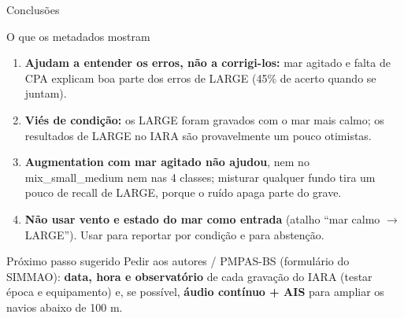 \documentclass[aspectratio=169]{beamer}
\begin{document}
\begin{frame}{Conclusões}
    \footnotesize
    \begin{block}{\small O que os metadados mostram}
        \scriptsize
        \begin{enumerate}
            \setlength{\itemsep}{2pt}
            \item \textbf{Ajudam a entender os erros, não a corrigi-los:} mar agitado e falta de CPA explicam boa parte dos erros de LARGE (45\% de acerto quando se juntam).
            \item \textbf{Viés de condição:} os LARGE foram gravados com o mar mais calmo; os resultados de LARGE no IARA são provavelmente um pouco otimistas.
            \item \textbf{Augmentation com mar agitado não ajudou}, nem no mix\_small\_medium nem nas 4 classes; misturar qualquer fundo tira um pouco de recall de LARGE, porque o ruído apaga parte do grave.
            \item \textbf{Não usar vento e estado do mar como entrada} (atalho ``mar calmo $\rightarrow$ LARGE''). Usar para reportar por condição e para abstenção.
        \end{enumerate}
    \end{block}
    \begin{alertblock}{\small Próximo passo sugerido}
        \scriptsize
        Pedir aos autores / PMPAS-BS (formulário do SIMMAO): \textbf{data, hora e observatório} de cada gravação do IARA (testar época e equipamento) e, se possível, \textbf{áudio contínuo + AIS} para ampliar os navios abaixo de 100 m.
    \end{alertblock}
\end{frame}
\end{document}
